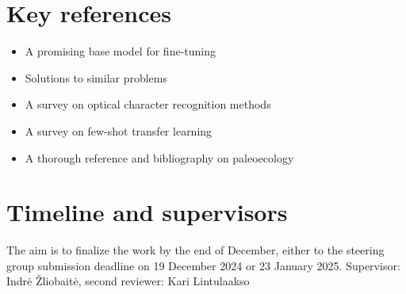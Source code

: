 \documentclass{article}
\begin{document}
\section{Key references}

\begin{itemize}
    \item \cite{li2021trocr} A promising base model for fine-tuning
    \item \cite{10478003} \cite{10.1145/3075645} \cite{10.1145/3542954.3542957} Solutions to similar problems
    \item \cite{9151144} A survey on optical character recognition methods 
    \item \cite{10.1145/3582688} A survey on few-shot transfer learning
    \item \cite{Faith_Lyman_2019} A thorough reference and bibliography on paleoecology
\end{itemize}

\section{Timeline and supervisors}

The aim is to finalize the work by the end of December, either to the steering group submission deadline on 19 December 2024 
or 23 January 2025. Supervisor: Indrė Žliobaitė, second reviewer: Kari Lintulaakso

\printbibliography
\end{document}
